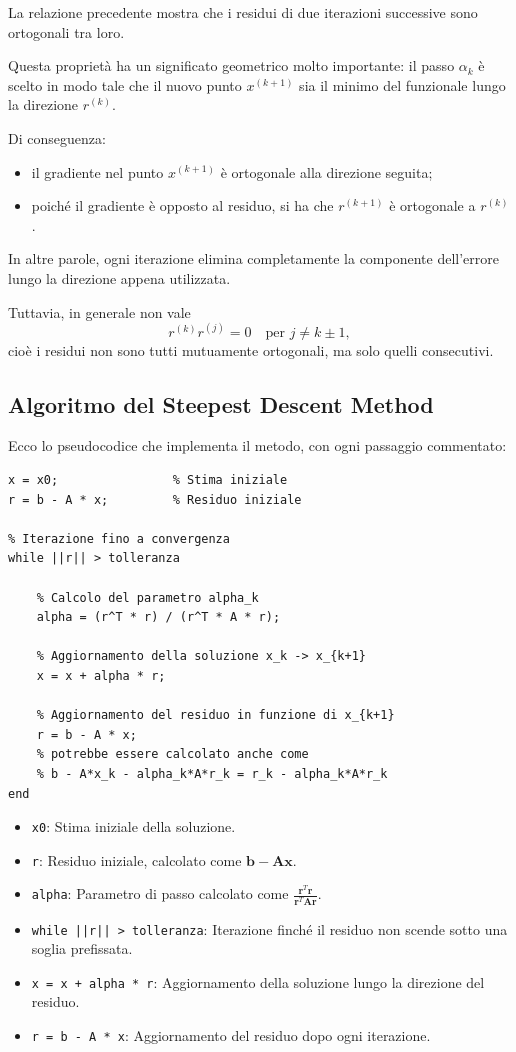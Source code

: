 La relazione precedente mostra che i residui di due iterazioni successive sono ortogonali tra loro.

Questa proprietà ha un significato geometrico molto importante: il passo $\alpha_k$ è scelto in modo tale che il nuovo punto $x^{(k+1)}$ sia il minimo del funzionale lungo la direzione $r^{(k)}$.

Di conseguenza:
\begin{itemize}
	\item il gradiente nel punto $x^{(k+1)}$ è ortogonale alla direzione seguita;
	\item poiché il gradiente è opposto al residuo, si ha che $r^{(k+1)}$ è ortogonale a $r^{(k)}$.
\end{itemize}

In altre parole, ogni iterazione elimina completamente la componente dell'errore lungo la direzione appena utilizzata.

Tuttavia, in generale non vale
\[
r^{(k)} r^{(j)} = 0 \quad \text{per } j \neq k \pm 1,
\]
cioè i residui non sono tutti mutuamente ortogonali, ma solo quelli consecutivi.

%
%
%
\subsection{Algoritmo del Steepest Descent Method}
Ecco lo pseudocodice che implementa il metodo, con ogni passaggio commentato:

\begin{lstlisting}[caption={Algoritmo del Steepest Descent Method}]
% Inizializzazione
x = x0;                % Stima iniziale
r = b - A * x;         % Residuo iniziale
	
% Iterazione fino a convergenza
while ||r|| > tolleranza
	
	% Calcolo del parametro alpha_k
	alpha = (r^T * r) / (r^T * A * r);
		
	% Aggiornamento della soluzione x_k -> x_{k+1}
	x = x + alpha * r;
		
	% Aggiornamento del residuo in funzione di x_{k+1}
	r = b - A * x;
	% potrebbe essere calcolato anche come 
	% b - A*x_k - alpha_k*A*r_k = r_k - alpha_k*A*r_k
end
\end{lstlisting}

\begin{itemize}
	\item \texttt{x0}: Stima iniziale della soluzione.
	\item \texttt{r}: Residuo iniziale, calcolato come \(\mathbf{b} - \mathbf{A} \mathbf{x}\).
	\item \texttt{alpha}: Parametro di passo calcolato come \(\frac{\mathbf{r}^T \mathbf{r}}{\mathbf{r}^T \mathbf{A} \mathbf{r}}\).
	\item \texttt{while ||r|| > tolleranza}: Iterazione finché il residuo non scende sotto una soglia prefissata.
	\item \texttt{x = x + alpha * r}: Aggiornamento della soluzione lungo la direzione del residuo.
	\item \texttt{r = b - A * x}: Aggiornamento del residuo dopo ogni iterazione.
\end{itemize}


